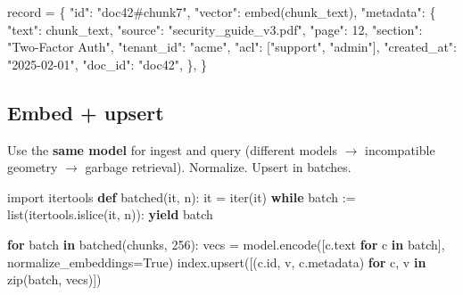 \documentclass[11pt]{article}
\newenvironment{Shaded}{\begin{snugshade}}{\end{snugshade}}
\newcommand{\BuiltInTok}[1]{\textcolor[rgb]{0.50,0.55,0.55}{#1}}
\newcommand{\ControlFlowTok}[1]{\textcolor[rgb]{0.99,0.74,0.29}{\textbf{#1}}}
\newcommand{\DecValTok}[1]{\textcolor[rgb]{0.96,0.45,0.00}{#1}}
\newcommand{\ImportTok}[1]{\textcolor[rgb]{0.15,0.68,0.38}{#1}}
\newcommand{\KeywordTok}[1]{\textcolor[rgb]{0.81,0.81,0.76}{\textbf{#1}}}
\newcommand{\NormalTok}[1]{\textcolor[rgb]{0.81,0.81,0.76}{#1}}
\newcommand{\OperatorTok}[1]{\textcolor[rgb]{0.81,0.81,0.76}{#1}}
\newcommand{\StringTok}[1]{\textcolor[rgb]{0.96,0.31,0.31}{#1}}
\newcommand{\VariableTok}[1]{\textcolor[rgb]{0.15,0.68,0.68}{#1}}
\begin{document}

\begin{Shaded}
\begin{Highlighting}[]
\NormalTok{record }\OperatorTok{=}\NormalTok{ \{}
    \StringTok{"id"}\NormalTok{: }\StringTok{"doc42\#chunk7"}\NormalTok{,}
    \StringTok{"vector"}\NormalTok{: embed(chunk\_text),}
    \StringTok{"metadata"}\NormalTok{: \{}
        \StringTok{"text"}\NormalTok{: chunk\_text,}
        \StringTok{"source"}\NormalTok{: }\StringTok{"security\_guide\_v3.pdf"}\NormalTok{,}
        \StringTok{"page"}\NormalTok{: }\DecValTok{12}\NormalTok{, }\StringTok{"section"}\NormalTok{: }\StringTok{"Two{-}Factor Auth"}\NormalTok{,}
        \StringTok{"tenant\_id"}\NormalTok{: }\StringTok{"acme"}\NormalTok{, }\StringTok{"acl"}\NormalTok{: [}\StringTok{"support"}\NormalTok{, }\StringTok{"admin"}\NormalTok{],}
        \StringTok{"created\_at"}\NormalTok{: }\StringTok{"2025{-}02{-}01"}\NormalTok{, }\StringTok{"doc\_id"}\NormalTok{: }\StringTok{"doc42"}\NormalTok{,}
\NormalTok{    \},}
\NormalTok{\}}
\end{Highlighting}
\end{Shaded}

\subsection{Embed + upsert}\label{embed--upsert}

Use the \textbf{same model} for ingest and query (different models \(\rightarrow\) incompatible geometry \(\rightarrow\) garbage retrieval). Normalize. Upsert in batches.


\begin{Shaded}
\begin{Highlighting}[]
\ImportTok{import}\NormalTok{ itertools}
\KeywordTok{def}\NormalTok{ batched(it, n):}
\NormalTok{    it }\OperatorTok{=} \BuiltInTok{iter}\NormalTok{(it)}
    \ControlFlowTok{while}\NormalTok{ batch }\OperatorTok{:=} \BuiltInTok{list}\NormalTok{(itertools.islice(it, n)):}
        \ControlFlowTok{yield}\NormalTok{ batch}

\ControlFlowTok{for}\NormalTok{ batch }\KeywordTok{in}\NormalTok{ batched(chunks, }\DecValTok{256}\NormalTok{):}
\NormalTok{    vecs }\OperatorTok{=}\NormalTok{ model.encode([c.text }\ControlFlowTok{for}\NormalTok{ c }\KeywordTok{in}\NormalTok{ batch], normalize\_embeddings}\OperatorTok{=}\VariableTok{True}\NormalTok{)}
\NormalTok{    index.upsert([(c.}\BuiltInTok{id}\NormalTok{, v, c.metadata) }\ControlFlowTok{for}\NormalTok{ c, v }\KeywordTok{in} \BuiltInTok{zip}\NormalTok{(batch, vecs)])}
\end{Highlighting}
\end{Shaded}
\end{document}
